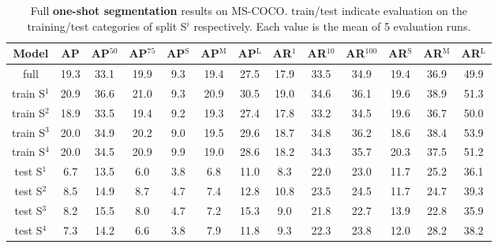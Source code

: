 \documentclass{article}
\newcommand{\coco}{MS-COCO\xspace}
\begin{document}
\begin{table}[h]
\begin{center}
\begin{small}
\begin{tabular}{c|ccc|ccc|ccc|ccc}
Model & AP & AP$^{50}$ & AP$^{75}$ & AP$^\text{S}$ & AP$^\text{M}$ & AP$^\text{L}$ & AR$^{1}$ & AR$^{10}$ & AR$^{100}$ & AR$^\text{S}$ & AR$^\text{M}$ & AR$^\text{L}$\\
\hline
full & 19.3 & 33.1 & 19.9 & 9.3 & 19.4 & 27.5 & 17.9 & 33.5 & 34.9 & 19.4 & 36.9 & 49.9 \\
\hline
train S$^1$ & 20.9 & 36.6 & 21.0 & 9.3 & 20.9 & 30.5 & 19.0 & 34.6 & 36.1 & 19.6 & 38.9 & 51.3 \\
train S$^2$ & 18.9 & 33.5 & 19.4 & 9.2 & 19.3 & 27.4 & 17.8 & 33.2 & 34.5 & 19.6 & 36.7 & 50.0 \\
train S$^3$ & 20.0 & 34.9 & 20.2 & 9.0 & 19.5 & 29.6 & 18.7 & 34.8 & 36.2 & 18.6 & 38.4 & 53.9 \\
train S$^4$ & 20.0 & 34.5 & 20.9 & 9.9 & 19.0 & 28.6 & 18.2 & 34.3 & 35.7 & 20.3 & 37.5 & 51.2 \\
\hline
test S$^1$ & 6.7 & 13.5 & 6.0 & 3.8 & 6.8 & 11.0 & 8.3 & 22.0 & 23.0 & 11.7 & 25.2 & 36.1 \\
test S$^2$ & 8.5 & 14.9 & 8.7 & 4.7 & 7.4 & 12.8 & 10.8 & 23.5 & 24.5 & 11.7 & 24.7 & 39.3 \\
test S$^3$ & 8.2 & 15.5 & 8.0 & 4.7 & 7.2 & 15.3 & 9.0 & 21.8 & 22.7 & 13.9 & 22.8 & 35.9 \\
test S$^4$ & 7.3 & 14.2 & 6.6 & 3.8 & 7.9 & 11.8 & 9.3 & 22.3 & 23.8 & 12.0 & 28.2 & 38.2
\end{tabular}
\end{small}
\end{center}
\caption{Full \textbf{one-shot segmentation} results on \coco. train/test indicate evaluation on the training/test categories of split S$^i$ respectively. Each value is the mean of 5 evaluation runs.}
\vspace{-12pt}
\label{table:extended_one-shot_segmentation_results}
\end{table}
\end{document}
